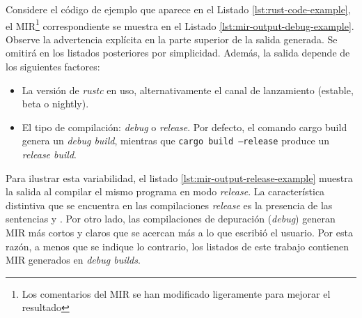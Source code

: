 Considere el código de ejemplo que aparece en el Listado \ref{lst:rust-code-example},
el \acrshort{MIR}\footnote{Los comentarios del MIR se han modificado ligeramente para mejorar el resultado}
correspondiente se muestra en el Listado \ref{lst:mir-output-debug-example}.
Observe la advertencia explícita en la parte superior de la salida generada. Se omitirá en los
listados posteriores por simplicidad.
Además, la salida depende de los siguientes factores:

\begin{itemize}
    \item La versión de \emph{rustc} en uso, alternativamente el canal de lanzamiento (estable, beta o nightly).
    \item El tipo de compilación: \emph{debug} o \emph{release}. Por defecto, el comando cargo build genera un
          \emph{debug build}, mientras que \texttt{cargo build --release} produce un \emph{release build}.
\end{itemize}

Para ilustrar esta variabilidad, el listado \ref{lst:mir-output-release-example}
muestra la salida al compilar el mismo programa en modo \emph{release}.
La característica distintiva que se encuentra en las compilaciones \emph{release} es la
presencia de las sentencias  y .
Por otro lado, las compilaciones de depuración (\emph{debug}) generan \acrshort{MIR} más cortos y claros
que se acercan más a lo que escribió el usuario.
Por esta razón, a menos que se indique lo contrario, los listados de este trabajo contienen \acrshort{MIR}
generados en \emph{debug builds}.

